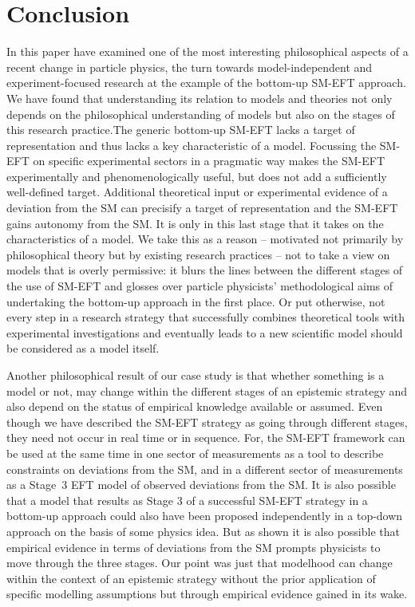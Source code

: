 \section{Conclusion}


In this paper have examined one of the most interesting philosophical aspects of a recent change in particle physics, the turn towards model-independent and experiment-focused research at the example of the bottom-up SM-EFT approach. 
We have found that understanding its relation to models and theories not only depends on the philosophical understanding of models 
but also on the stages of this research practice.The generic bottom-up SM-EFT lacks a target of representation and thus lacks a key characteristic of a model. Focussing the SM-EFT on specific experimental sectors in a pragmatic way makes the SM-EFT experimentally and phenomenologically useful, but does not add a sufficiently well-defined target. Additional theoretical input or experimental evidence of a deviation from the SM can precisify a target of representation and the SM-EFT gains autonomy from the SM. It is only in this last stage that it takes on the characteristics of a model.
We take this as a reason -- motivated not primarily by philosophical theory but by existing research practices -- not to take a view on models that is overly permissive: it blurs the lines between the different stages of the use of SM-EFT and glosses over particle physicists' methodological aims of undertaking the bottom-up approach in the first place. 
Or put otherwise, not every step in a research strategy that successfully combines theoretical tools with experimental investigations and eventually leads to a new scientific model should be considered as a model itself.

Another philosophical result of our case study is that whether something is a model or not, may change within the different stages of an epistemic strategy and also depend on the status of empirical knowledge available or assumed.
Even though we have described the SM-EFT strategy as going through different stages, they need not occur in real time or in sequence. For, the SM-EFT framework can be used at the same time in one sector of measurements as a tool to describe constraints on deviations from the SM, and in a different sector of measurements as a Stage~3 EFT model of observed deviations from the SM.
It is also possible that a model that results as Stage 3 of a successful SM-EFT strategy in a bottom-up approach could also have been proposed independently in a top-down approach on the basis of some physics idea. But as shown it is also possible that empirical evidence in terms of deviations from the SM prompts physicists to move through the three stages. Our point was just that modelhood can change within the context of an epistemic strategy without the prior application of specific modelling assumptions but through empirical evidence gained in its wake.







